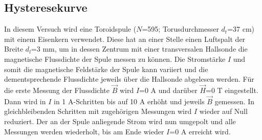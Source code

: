     \subsection{Hysteresekurve}

        In diesem Versuch wird eine Toroidspule ($N$=595; Torusdurchmesser $d_t$=37 \si{\centi\meter}) mit einem Eisenkern
        verwendet. Diese hat an einer Stelle einen Luftspalt der Breite $d_l$=3 \si{\milli\meter}, um in 
        dessen Zentrum mit einer transversalen Hallsonde die magnetische Flussdichte der Spule messen zu können.
        Die Stromstärke $I$ und somit die  magnetische Feldstärke der Spule kann
        variiert und die dementsprechende Flussdichte jeweils über die Hallsonde abgelesen werden.
        Für die erste Messung der Flussdichte $\vec B$ wird $I$=0 \si{\ampere} und darüber $\vec H$=0 \si{\tesla}
        eingestellt. Dann wird in  $I$ in 1 \si{\ampere}-Schritten bis auf 10 \si{\ampere} erhöht und jeweils $\vec B$
        gemessen. In gleichbleibenden Schritten mit zugehörigen Messungen wird $I$ wieder auf Null reduziert. Der an der Spule anliegende Strom wird nun umgepolt und alle Messungen werden
        wiederholt, bis am Ende wieder $I$=0 \si{\ampere} erreicht wird.

        
        

        

        

